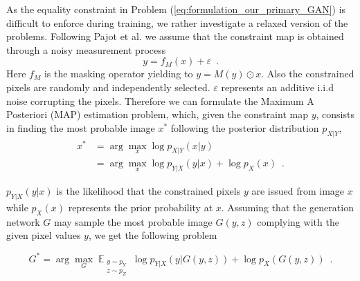 As the equality constraint in  Problem (\ref{eq:formulation_our_primary_GAN}) is difficult to enforce during training, we rather investigate a relaxed version of the problems.
%
%
Following Pajot et al. \cite{pajot2018unsupervised} we assume that the constraint map is obtained through a noisy measurement process
\begin{equation}
y = f_M(x) + \varepsilon \enspace.
\label{eq:noisy_generation_primary_CGAN}
\end{equation}
Here $f_M$ is the masking operator yielding to $y = M(y) \odot x$. Also the constrained pixels are randomly and independently selected. $\varepsilon$ represents an additive i.i.d noise corrupting the pixels. Therefore
we can formulate the Maximum A Posteriori (MAP) estimation problem, which, given the constraint map $y$, consists in finding the most probable image $x^*$ following the posterior distribution $p_{X|Y}$,
\begin{align}
x^* &= \arg\max_x\log {p_{X|Y}}(x|y) \\
&= \arg\max_x\log p_{Y|X}(y|x) + \log p_X(x) \enspace.
\label{eq:bayesian_formulation_our_primary_CGAN}
\end{align}

\noindent $p_{Y|X}(y|x)$ is the likelihood that the constrained pixels $y$ are issued from image $x$ while $p_X(x)$ represents the prior probability at $x$. Assuming that the generation network $G$ may sample the most probable image $G(y, z)$ complying with the given pixel values $y$, we get the following problem

\begin{equation}
G^* = \arg\max_G \mathop{\mathbb{E}}_{\substack{y\sim p_Y\\z\sim p_Z}} \log {p_{Y|X}}(y|G(y, z)
) + \log p_X(G(y, z)) \enspace.
\label{eq:bayesian_formulation_our_primary_CGAN_G}
\end{equation}


